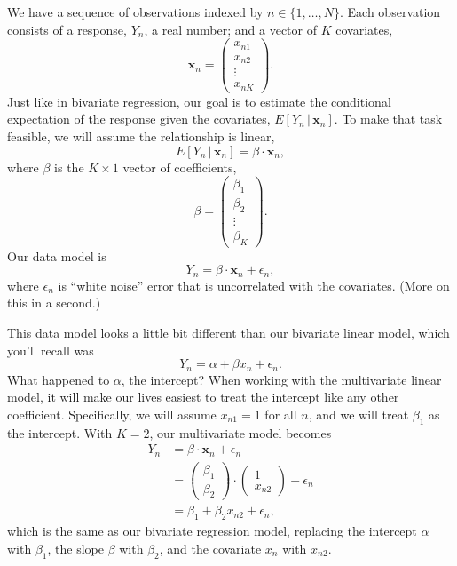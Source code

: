 \documentclass[
  12pt,
  oneside,openany]{book}
\begin{document}
We have a sequence of observations indexed by \(n \in \{1, \ldots, N\}\). Each observation consists of a response, \(Y_n\), a real number; and a vector of \(K\) covariates,
\[
\mathbf{x}_n = \begin{pmatrix}
  x_{n1} \\
  x_{n2} \\
  \vdots \\
  x_{nK}
\end{pmatrix}.
\]
Just like in bivariate regression, our goal is to estimate the conditional expectation of the response given the covariates, \(E[Y_n \,|\, \mathbf{x}_n]\). To make that task feasible, we will assume the relationship is linear,
\[
E[Y_n \,|\, \mathbf{x}_n] = \beta \cdot \mathbf{x}_n,
\]
where \(\beta\) is the \(K \times 1\) vector of coefficients,
\[
\beta = \begin{pmatrix}
  \beta_1 \\
  \beta_2 \\
  \vdots \\
  \beta_K
\end{pmatrix}.
\]
Our data model is
\[
Y_n = \beta \cdot \mathbf{x}_n + \epsilon_n,
\]
where \(\epsilon_n\) is ``white noise'' error that is uncorrelated with the covariates. (More on this in a second.)

This data model looks a little bit different than our bivariate linear model, which you'll recall was
\[
Y_n = \alpha + \beta x_n + \epsilon_n.
\]
What happened to \(\alpha\), the intercept? When working with the multivariate linear model, it will make our lives easiest to treat the intercept like any other coefficient. Specifically, we will assume \(x_{n1} = 1\) for all \(n\), and we will treat \(\beta_1\) as the intercept. With \(K = 2\), our multivariate model becomes
\[
\begin{aligned}
Y_n &= \beta \cdot \mathbf{x}_n + \epsilon_n \\
&= \begin{pmatrix} \beta_1 \\ \beta_2 \end{pmatrix} \cdot \begin{pmatrix} 1 \\ x_{n2} \end{pmatrix} + \epsilon_n \\
&= \beta_1 + \beta_2 x_{n2} + \epsilon_n,
\end{aligned}
\]
which is the same as our bivariate regression model, replacing the intercept \(\alpha\) with \(\beta_1\), the slope \(\beta\) with \(\beta_2\), and the covariate \(x_n\) with \(x_{n2}\).
\end{document}
